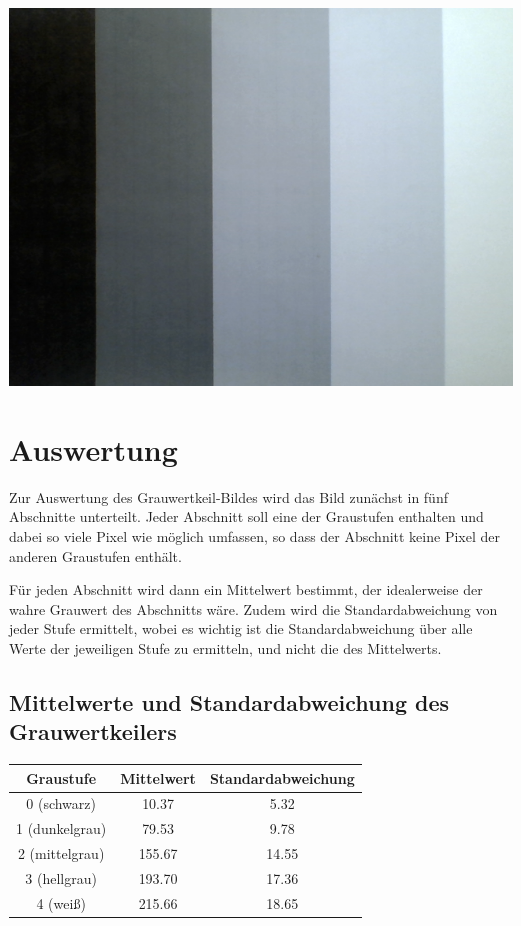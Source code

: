 \includegraphics[scale=0.7]{media/grauwertkeil/grauwertkeil.png}
\label{Fig:Grawertkeil}


\section{Auswertung}
\label{chap:VERSUCH_1_AUSWERTUNG}

Zur Auswertung des Grauwertkeil-Bildes wird das Bild zunächst in fünf Abschnitte unterteilt. Jeder Abschnitt soll eine der Graustufen enthalten und dabei so viele Pixel wie möglich umfassen, so dass der Abschnitt keine Pixel der anderen Graustufen enthält.

Für jeden Abschnitt wird dann ein Mittelwert bestimmt, der idealerweise der wahre Grauwert des Abschnitts wäre.
Zudem wird die Standardabweichung von jeder Stufe ermittelt, wobei es wichtig ist die Standardabweichung über alle Werte der jeweiligen Stufe zu ermitteln, und nicht die des Mittelwerts.

\subsection*{Mittelwerte und Standardabweichung des Grauwertkeilers}

\begin{tabular}{|c|c|c|}
\hline 
Graustufe & Mittelwert & Standardabweichung \\ 
\hline 
0 (schwarz) & 10.37 & 5.32 \\ 
\hline 
1 (dunkelgrau) & 79.53 & 9.78 \\ 
\hline 
2 (mittelgrau) & 155.67 & 14.55 \\ 
\hline 
3 (hellgrau) & 193.70 & 17.36 \\ 
\hline 
4 (weiß) & 215.66 & 18.65 \\ 
\hline 
\end{tabular} 

